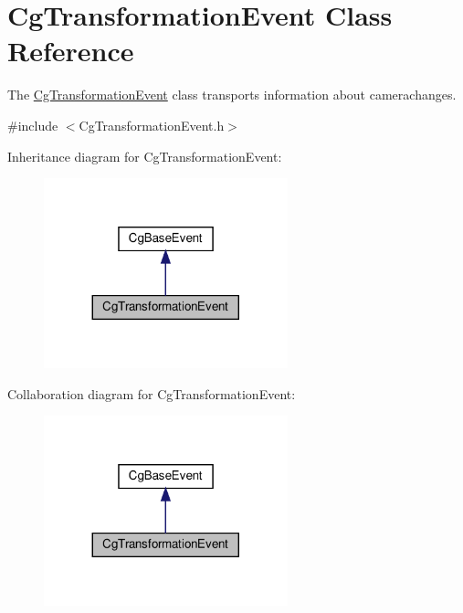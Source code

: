 \hypertarget{class_cg_transformation_event}{}\section{Cg\+Transformation\+Event Class Reference}
\label{class_cg_transformation_event}


The \hyperlink{class_cg_transformation_event}{Cg\+Transformation\+Event} class transports information about camerachanges.  




{\ttfamily \#include $<$Cg\+Transformation\+Event.\+h$>$}



Inheritance diagram for Cg\+Transformation\+Event\+:
\nopagebreak
\begin{figure}[H]
\begin{center}
\leavevmode
\includegraphics[width=200pt]{class_cg_transformation_event__inherit__graph}
\end{center}
\end{figure}


Collaboration diagram for Cg\+Transformation\+Event\+:
\nopagebreak
\begin{figure}[H]
\begin{center}
\leavevmode
\includegraphics[width=200pt]{class_cg_transformation_event__coll__graph}
\end{center}
\end{figure}

